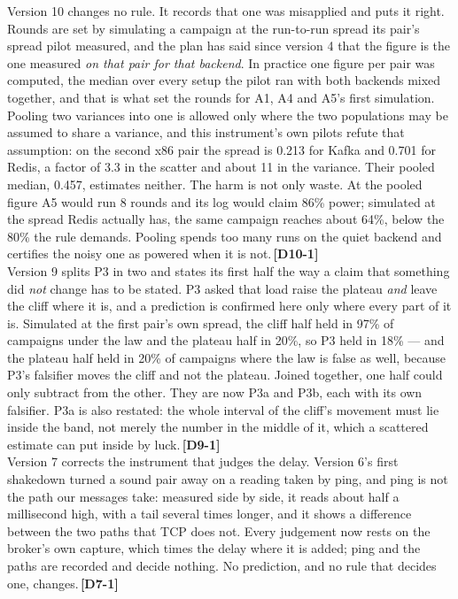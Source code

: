 \documentclass[11pt]{article}
\newcommand{\chg}[1]{\,{\color{chgcol}\bfseries\footnotesize[#1]}}
\newcommand{\chgold}[1]{\,{\color{oldcol}\bfseries\footnotesize[#1]}}
\begin{document}
{Version 10 changes no rule. It records that one was misapplied and puts it right. Rounds are set by simulating a campaign at the run-to-run spread its pair's spread pilot measured, and the plan has said since version 4 that the figure is the one measured \emph{on that pair for that backend}. In practice one figure per pair was computed, the median over every setup the pilot ran with both backends mixed together, and that is what set the rounds for A1, A4 and A5's first simulation. Pooling two variances into one is allowed only where the two populations may be assumed to share a variance, and this instrument's own pilots refute that assumption: on the second x86 pair the spread is 0.213 for Kafka and 0.701 for Redis, a factor of 3.3 in the scatter and about 11 in the variance. Their pooled median, 0.457, estimates neither. The harm is not only waste. At the pooled figure A5 would run 8 rounds and its log would claim 86\% power; simulated at the spread Redis actually has, the same campaign reaches about 64\%, below the 80\% the rule demands. Pooling spends too many runs on the quiet backend and certifies the noisy one as powered when it is not.\chg{D10-1}\\[3pt]
Version 9 splits P3 in two and states its first half the way a claim that something did \emph{not} change has to be stated. P3 asked that load raise the plateau \emph{and} leave the cliff where it is, and a prediction is confirmed here only where every part of it is. Simulated at the first pair's own spread, the cliff half held in 97\% of campaigns under the law and the plateau half in 20\%, so P3 held in 18\% --- and the plateau half held in 20\% of campaigns where the law is false as well, because P3's falsifier moves the cliff and not the plateau. Joined together, one half could only subtract from the other. They are now P3a and P3b, each with its own falsifier. P3a is also restated: the whole interval of the cliff's movement must lie inside the band, not merely the number in the middle of it, which a scattered estimate can put inside by luck.\chg{D9-1}\\[3pt]
Version 7 corrects the instrument that judges the delay. Version 6's first shakedown turned a sound pair away on a reading taken by ping, and ping is not the path our messages take: measured side by side, it reads about half a millisecond high, with a tail several times longer, and it shows a difference between the two paths that TCP does not. Every judgement now rests on the broker's own capture, which times the delay where it is added; ping and the paths are recorded and decide nothing. No prediction, and no rule that decides one, changes.\chgold{D7-1}}
\end{document}
